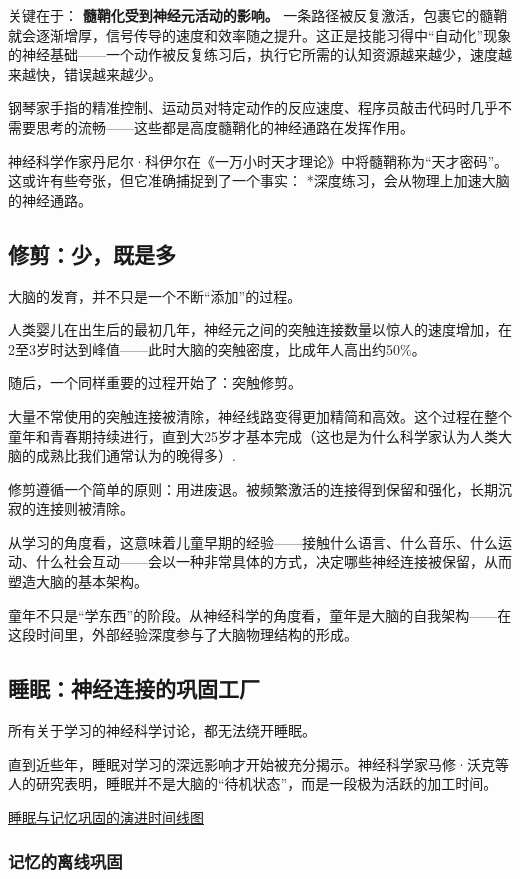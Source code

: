 \documentclass[11pt]{article}
\begin{document}
关键在于： \textbf{髓鞘化受到神经元活动的影响。} 一条路径被反复激活，包裹它的髓鞘就会逐渐增厚，信号传导的速度和效率随之提升。这正是技能习得中“自动化”现象的神经基础——一个动作被反复练习后，执行它所需的认知资源越来越少，速度越来越快，错误越来越少。

钢琴家手指的精准控制、运动员对特定动作的反应速度、程序员敲击代码时几乎不需要思考的流畅——这些都是高度髓鞘化的神经通路在发挥作用。

神经科学作家丹尼尔·科伊尔在《一万小时天才理论》中将髓鞘称为“天才密码”。这或许有些夸张，但它准确捕捉到了一个事实： *深度练习，会从物理上加速大脑的神经通路。
\subsection{修剪：少，既是多}
\label{sec:orgf2509eb}

大脑的发育，并不只是一个不断“添加”的过程。

人类婴儿在出生后的最初几年，神经元之间的突触连接数量以惊人的速度增加，在2至3岁时达到峰值——此时大脑的突触密度，比成年人高出约50\%。

随后，一个同样重要的过程开始了：突触修剪。

大量不常使用的突触连接被清除，神经线路变得更加精简和高效。这个过程在整个童年和青春期持续进行，直到大25岁才基本完成（这也是为什么科学家认为人类大脑的成熟比我们通常认为的晚得多）.

修剪遵循一个简单的原则：用进废退。被频繁激活的连接得到保留和强化，长期沉寂的连接则被清除。

从学习的角度看，这意味着儿童早期的经验——接触什么语言、什么音乐、什么运动、什么社会互动——会以一种非常具体的方式，决定哪些神经连接被保留，从而塑造大脑的基本架构。

童年不只是“学东西”的阶段。从神经科学的角度看，童年是大脑的自我架构——在这段时间里，外部经验深度参与了大脑物理结构的形成。
\subsection{睡眠：神经连接的巩固工厂}
\label{sec:orgc9418ba}

所有关于学习的神经科学讨论，都无法绕开睡眠。

直到近些年，睡眠对学习的深远影响才开始被充分揭示。神经科学家马修·沃克等人的研究表明，睡眠并不是大脑的“待机状态”，而是一段极为活跃的加工时间。

\href{file:///c:/Users/fupen/org/book/插图/睡眠与记忆巩固的演进时间线图.png}{睡眠与记忆巩固的演进时间线图}
\subsubsection{记忆的离线巩固}
\label{sec:org832ab7e}
\end{document}
